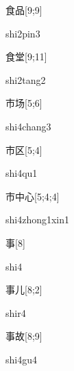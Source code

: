 \begin{verbete}{食品}[9;9]
\begin{pronuncia}{shi2pin3}
\end{pronuncia}
\end{verbete}

\begin{verbete}{食堂}[9;11]
\begin{pronuncia}{shi2tang2}
\end{pronuncia}
\end{verbete}

\begin{verbete}{市场}[5;6]
\begin{pronuncia}{shi4chang3}
\end{pronuncia}
\end{verbete}

\begin{verbete}[shi4qu1]{市区}[5;4]
\begin{pronuncia}{shi4qu1}
\end{pronuncia}
\end{verbete}

\begin{verbete}{市中心}[5;4;4]
\begin{pronuncia}{shi4zhong1xin1}
\end{pronuncia}
\end{verbete}

\begin{verbete}[shi4]{事}[8]
\begin{pronuncia}{shi4}
\end{pronuncia}
\end{verbete}

\begin{verbete}[shir4]{事儿}[8;2]
\begin{pronuncia}{shir4}
\end{pronuncia}
\end{verbete}

\begin{verbete}[shi4gu4]{事故}[8;9]
\begin{pronuncia}{shi4gu4}
\end{pronuncia}
\end{verbete}

